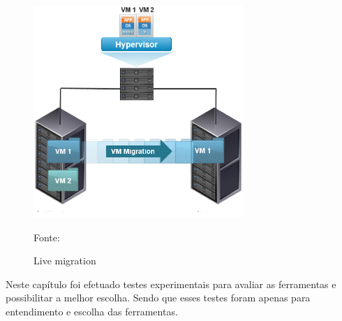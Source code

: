 
\begin{figure}[h!]
 \centering
 \includegraphics[width=300px]{img/vms_migration.eps}
 \caption{Live migration}
 Fonte: \citet{spaniol2015}
 \label{fig:vms_migration}
\end{figure}

Neste capítulo foi efetuado testes experimentais para avaliar as ferramentas e possibilitar a melhor escolha.
Sendo que esses testes foram apenas para entendimento e escolha das ferramentas.


